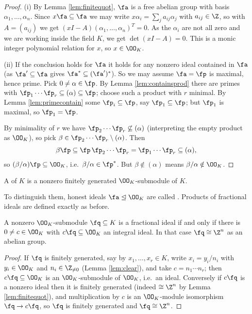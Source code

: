 \begin{proof}
	(i) By Lemma \ref{lem:finitequot}, $\fa$ is a free abelian group with basis $\alpha_1, \dots, \alpha_n$. Since $x\fa \subseteq \fa$ we may write $x\alpha_i = \sum_j a_{ij}\alpha_j$ with $a_{ij} \in \Z$, so with $A = (a_{ij})$ we get $(xI - A)(\alpha_1,\dots,\alpha_n)^T = 0$. As the $\alpha_i$ are not all zero and we are working inside the field $K$, we get $\det(xI-A) = 0$. This is a monic integer polynomial relation for $x$, so $x \in \OO_K$.

	(ii) If the conclusion holds for $\fa$ it holds for any nonzero ideal contained in $\fa$ (as $\fa' \subseteq \fa$ gives $\fa^* \subseteq (\fa')^*$). So we may assume $\fa = \fp$ is maximal, hence prime. Pick $0 \neq \alpha \in \fp$. By Lemma \ref{lem:containsprod} there are primes with $\fp_1\cdots\fp_r \subseteq (\alpha) \subseteq \fp$; choose such a product with $r$ minimal. By Lemma \ref{lem:primecontain} some $\fp_i \subseteq \fp$, say $\fp_1 \subseteq \fp$; but $\fp_1$ is maximal, so $\fp_1 = \fp$.

	By minimality of $r$ we have $\fp_2\cdots\fp_r \not\subseteq (\alpha)$ (interpreting the empty product as $\OO_K$), so pick $\beta \in \fp_2\cdots\fp_r \setminus (\alpha)$. Then
	$$\beta\fp \subseteq \fp\,\fp_2\cdots\fp_r = \fp_1\cdots\fp_r \subseteq (\alpha),$$
	so $(\beta/\alpha)\fp \subseteq \OO_K$, i.e.\ $\beta/\alpha \in \fp^*$. But $\beta \notin (\alpha)$ means $\beta/\alpha \notin \OO_K$.
\end{proof}

\begin{definition}
	A  of $K$ is a nonzero finitely generated $\OO_K$-submodule of $K$.
\end{definition}

To distinguish them, honest ideals $\fa \trianglelefteq \OO_K$ are called . Products of fractional ideals are defined exactly as before.

\begin{lemma}\label{lem:fracclear}
	A nonzero $\OO_K$-submodule $\fq \subseteq K$ is a fractional ideal if and only if there is $0 \neq c \in \OO_K$ with $c\fq \subseteq \OO_K$ an integral ideal. In that case $\fq \cong \Z^n$ as an abelian group.
\end{lemma}

\begin{proof}
	If $\fq$ is finitely generated, say by $x_1, \dots, x_r \in K$, write $x_i = y_i/n_i$ with $y_i \in \OO_K$ and $n_i \in \Z_{\neq 0}$ (Lemma \ref{lem:clear}), and take $c = n_1\cdots n_r$; then $c\fq \subseteq \OO_K$ is an $\OO_K$-submodule of $\OO_K$, i.e.\ an ideal. Conversely if $c\fq$ is a nonzero ideal then it is finitely generated (indeed $\cong \Z^n$ by Lemma \ref{lem:finitequot}), and multiplication by $c$ is an $\OO_K$-module isomorphism $\fq \to c\fq$, so $\fq$ is finitely generated and $\fq \cong \Z^n$.
\end{proof}

